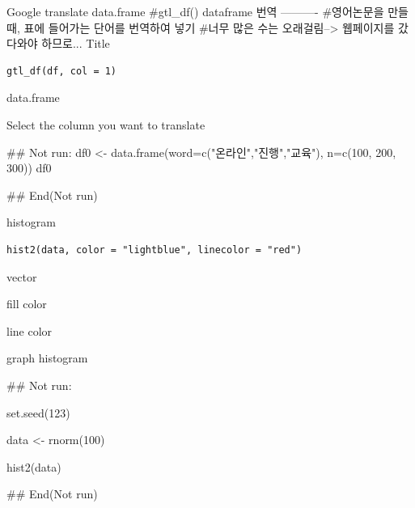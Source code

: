 \documentclass[a4paper]{book}
\begin{document}
%
\begin{Description}
Google translate data.frame
\#gtl\_df() dataframe 번역 ----------
\#영어논문을 만들 때, 표에 들어가는 단어를 번역하여 넣기
\#너무 많은 수는 오래걸림--> 웹페이지를 갔다와야 하므로...
Title
\end{Description}
%
\begin{Usage}
\begin{verbatim}
gtl_df(df, col = 1)
\end{verbatim}
\end{Usage}
%
\begin{Arguments}
\begin{ldescription}
\item[\code{df}] data.frame

\item[\code{col}] Select the column you want to translate
\end{ldescription}
\end{Arguments}
%
\begin{Examples}
\begin{ExampleCode}
\#\# Not run: 
 df0 <-  data.frame(word=c("온라인","진행","교육"),
                   n=c(100, 200, 300))
 df0 %

## End(Not run)


\end{ExampleCode}
\end{Examples}

%
\begin{Description}
histogram
\end{Description}
%
\begin{Usage}
\begin{verbatim}
hist2(data, color = "lightblue", linecolor = "red")
\end{verbatim}
\end{Usage}
%
\begin{Arguments}
\begin{ldescription}
\item[\code{data}] vector

\item[\code{color}] fill color

\item[\code{linecolor}] line color
\end{ldescription}
\end{Arguments}
%
\begin{Value}
graph histogram
\end{Value}
%
\begin{Examples}
\begin{ExampleCode}
 \#\# Not run: 

set.seed(123)

data <- rnorm(100)

hist2(data)

 
## End(Not run)

\end{ExampleCode}
\end{Examples}
\end{document}
